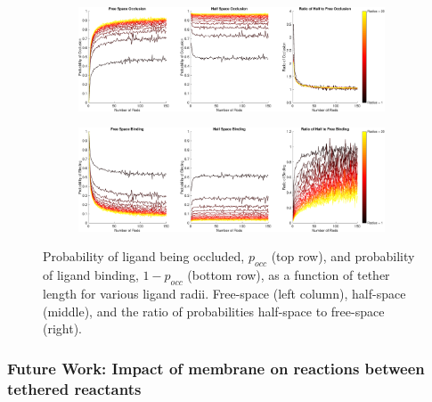 \documentclass[../../AdvancementSummary.tex]{subfiles}
\begin{document}
\begin{figure}[h]
    \begin{center}
        \begin{subfigure}{\linewidth}
        		\includegraphics[width=\linewidth]{ResultsFigures/BindingSurfaceFactor/OcclusionVSN.eps}
        		\caption{}
        \end{subfigure}
        	\begin{subfigure}{\linewidth}
        		\includegraphics[width=\linewidth]{ResultsFigures/BindingSurfaceFactor/BindingVSN.eps}
        		\caption{}
        \end{subfigure}
        \caption{Probability of ligand being occluded, $p_{occ}$ (top row), and probability of ligand binding, $1-p_{occ}$ (bottom row), as a function of tether length for various ligand radii. Free-space (left column), half-space (middle), and the ratio of probabilities half-space to free-space (right). \label{fig: OcclusionVSN} }
       \end{center}
\end{figure}
       

\subsubsection{Future Work: Impact of membrane on reactions between tethered reactants}
\end{document}
